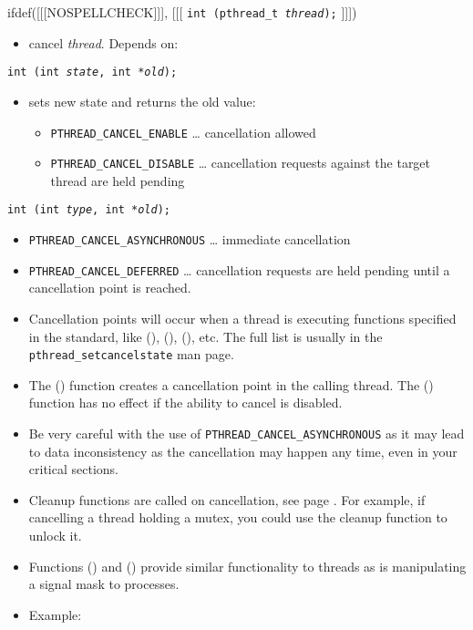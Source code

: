 \begin{slide}
\setlength{\baselineskip}{0.9\baselineskip}
ifdef([[[NOSPELLCHECK]]], [[[
\texttt{int (pthread\_t \emph{thread});}
]]])
\begin{itemize}
\item cancel \emph{thread}.  Depends on:
\end{itemize}
\texttt{int (int \emph{state},
int *\emph{old});}
\begin{itemize}
\item sets new state and returns the old value:
    \begin{itemize}
    \item \texttt{PTHREAD\_CANCEL\_ENABLE} \dots{} cancellation allowed
    \item \texttt{PTHREAD\_CANCEL\_DISABLE} \dots{} cancellation requests
    against the target thread are held pending
    \end{itemize}
\end{itemize}
\texttt{int (int \emph{type}, int *\emph{old});}
\begin{itemize}
\item \texttt{PTHREAD\_CANCEL\_ASYNCHRONOUS} \dots{} immediate cancellation
\item \texttt{PTHREAD\_CANCEL\_DEFERRED} \dots{} cancellation requests are held
pending until a cancellation point is reached.
\end{itemize}
\end{slide}

\begin{itemize}
\item Cancellation points will occur when a thread is executing functions
specified in the standard, like (), (),
(), etc.  The full list is usually in the
\texttt{pthread\_setcancelstate} man page.
\item The () function creates a cancellation point in
the calling thread.  The () function has no effect if
the ability to cancel is disabled.
\item Be very careful with the use of \texttt{PTHREAD\_CANCEL\_ASYNCHRONOUS} as
it may lead to data inconsistency as the cancellation may happen any time, even
in your critical sections.
\item Cleanup functions are called on cancellation, see page
\pageref{PTHREAD_CLEANUP}.  For example, if cancelling a thread holding a mutex,
you could use the cleanup function to unlock it.
\item Functions () and
() provide similar functionality to threads as is
manipulating a signal mask to processes.
\item {} Example: 
\end{itemize}


